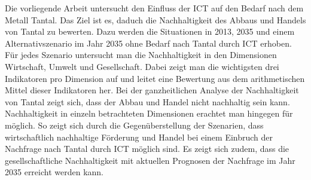 Die vorliegende Arbeit untersucht den Einfluss der ICT auf den Bedarf nach dem Metall Tantal. Das Ziel ist es, daduch die Nachhaltigkeit des Abbaus und Handels von Tantal zu bewerten.
Dazu werden die Situationen in 2013, 2035 und einem Alternativszenario im Jahr 2035 ohne Bedarf nach Tantal durch ICT erhoben. Für jedes Szenario untersucht man die Nachhaltigkeit in den Dimensionen Wirtschaft, Umwelt und Gesellschaft. Dabei zeigt man die wichtigsten drei Indikatoren pro Dimension auf und leitet eine Bewertung aus dem arithmetischen Mittel dieser Indikatoren her.
Bei der ganzheitlichen Analyse der Nachhaltigkeit von Tantal zeigt sich, dass der Abbau und Handel nicht nachhaltig sein kann. Nachhaltigkeit in einzeln betrachteten Dimensionen erachtet man hingegen für möglich. So zeigt sich durch die Gegenüberstellung der Szenarien, dass wirtschaftlich nachhaltige Förderung und Handel bei einem Einbruch der Nachfrage nach Tantal durch ICT möglich sind. Es zeigt sich zudem, dass die gesellschaftliche Nachhaltigkeit mit aktuellen Prognosen der Nachfrage im Jahr 2035 erreicht werden kann.
